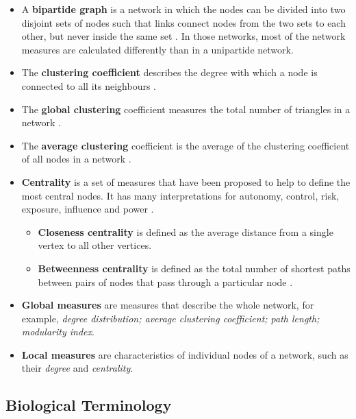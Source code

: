 \documentclass[
]{book}
\begin{document}
\begin{itemize}
\item
  A \textbf{bipartide graph} is a network in which the nodes can be divided into two disjoint sets of nodes such that links connect nodes from the two sets to each other, but never inside the same set \citep{Barabasi2016}. In those networks, most of the network measures are calculated differently than in a unipartide network.
\item
  The \textbf{clustering coefficient} describes the degree with which a node is connected to all its neighbours \citep{barabasi2004network}.
\item
  The \textbf{global clustering} coefficient measures the total number of triangles in a network \citep{Barabasi2016}.
\item
  The \textbf{average clustering} coefficient is the average of the clustering coefficient of all nodes in a network \citep{barabasi2004network}.
\item
  \textbf{Centrality} is a set of measures that have been proposed to help to define the most central nodes. It has many interpretations for autonomy, control, risk, exposure, influence and power \citep{Borgatti2006ACentrality}.

  \begin{itemize}
  \item
    \textbf{Closeness centrality} is defined as the average distance from a single vertex to all other vertices\citep{Newman2018}.
  \item
    \textbf{Betweenness centrality} is defined as the total number of shortest paths between pairs of nodes that pass through a particular node \citep{Newman2018}.
  \end{itemize}
\item
  \textbf{Global measures} are measures that describe the whole network, for example, \emph{degree distribution; average clustering coefficient; path length; modularity index}.
\item
  \textbf{Local measures} are characteristics of individual nodes of a network, such as their \emph{degree} and \emph{centrality}.
\end{itemize}

\hypertarget{biological-terminology}{%
\subsection{Biological Terminology}\label{biological-terminology}}
\end{document}

